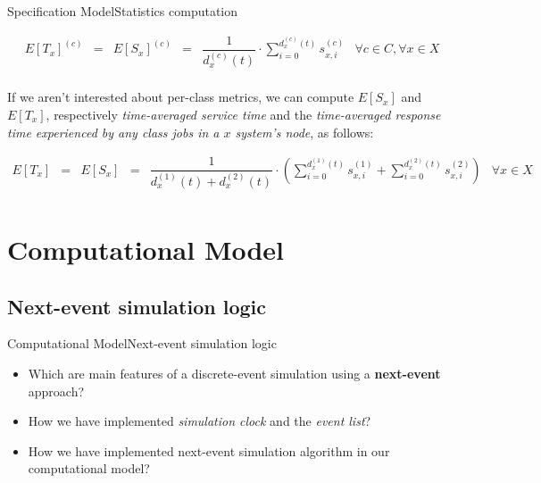 \documentclass[10pt]{beamer}
\begin{document}
\begin{frame}{Specification Model}{Statistics computation}

\begin{equation}
\begin{array} {rccccr} 
E[T_x]^{(c)} & = & E[S_x]^{(c)} & = & \displaystyle \dfrac{1}{d_x^{(c)}(t)} \cdot \sum_{i = 0}^{d_x^{(c)}(t)} s_{x,i}^{(c)} & \forall c \in C, \forall x \in X \\
\end{array}
\end{equation}

If we aren't interested about per-class metrics, we can compute $E[S_x]$ and $E[T_x]$, respectively \textit{time-averaged service time} and the \textit{time-averaged response time experienced by any class jobs in a $x$ system's node}, as follows:

\begin{equation}
\begin{array} {rccccr} 
E[T_x] & = & E[S_x] & = & \displaystyle \dfrac{1}{d_x^{(1)}(t) + d_x^{(2)}(t)} \cdot \left( \sum_{i = 0}^{d_x^{(1)}(t)} s_{x,i}^{(1)} + \sum_{i = 0}^{d_x^{(2)}(t)} s_{x,i}^{(2)} \right) & \forall x \in X \\
\end{array}
\end{equation}


\end{frame}




\section{Computational Model}


\subsection{Next-event simulation logic}

\begin{frame}{Computational Model}{Next-event simulation logic}

\begin{itemize}
\item Which are main features of a discrete-event simulation using a \textbf{next-event} approach?

\item How we have implemented \textit{simulation clock} and the \textit{event list}?

\item How we have implemented next-event simulation algorithm in our computational model?
\end{itemize}

\end{frame}
\end{document}

